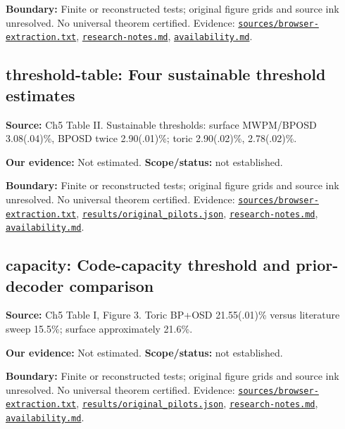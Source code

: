 \documentclass[11pt]{article}
\begin{document}
\textbf{Boundary:} Finite or reconstructed tests; original figure grids and source ink unresolved. No universal theorem certified. Evidence: \href{https://github.com/alectionary/vibe-math/blob/master/formalization/quintavalle-hgp/sources/browser-extraction.txt}{\nolinkurl{sources/browser-extraction.txt}}, \href{https://github.com/alectionary/vibe-math/blob/master/formalization/quintavalle-hgp/research-notes.md}{\nolinkurl{research-notes.md}}, \href{https://github.com/alectionary/vibe-math/blob/master/formalization/quintavalle-hgp/availability.md}{\nolinkurl{availability.md}}.
\subsection{threshold-table: Four sustainable threshold estimates}
\label{claim:threshold-table}
\textbf{Source:} Ch5 Table II. Sustainable thresholds: surface MWPM/BPOSD 3.08(.04)\%, BPOSD twice 2.90(.01)\%; toric 2.90(.02)\%, 2.78(.02)\%.

\textbf{Our evidence:} Not estimated. \textbf{Scope/status:} not established.

\textbf{Boundary:} Finite or reconstructed tests; original figure grids and source ink unresolved. No universal theorem certified. Evidence: \href{https://github.com/alectionary/vibe-math/blob/master/formalization/quintavalle-hgp/sources/browser-extraction.txt}{\nolinkurl{sources/browser-extraction.txt}}, \href{https://github.com/alectionary/vibe-math/blob/master/formalization/quintavalle-hgp/results/original_pilots.json}{\nolinkurl{results/original_pilots.json}}, \href{https://github.com/alectionary/vibe-math/blob/master/formalization/quintavalle-hgp/research-notes.md}{\nolinkurl{research-notes.md}}, \href{https://github.com/alectionary/vibe-math/blob/master/formalization/quintavalle-hgp/availability.md}{\nolinkurl{availability.md}}.
\subsection{capacity: Code-capacity threshold and prior-decoder comparison}
\label{claim:capacity}
\textbf{Source:} Ch5 Table I, Figure 3. Toric BP+OSD 21.55(.01)\% versus literature sweep 15.5\%; surface approximately 21.6\%.

\textbf{Our evidence:} Not estimated. \textbf{Scope/status:} not established.

\textbf{Boundary:} Finite or reconstructed tests; original figure grids and source ink unresolved. No universal theorem certified. Evidence: \href{https://github.com/alectionary/vibe-math/blob/master/formalization/quintavalle-hgp/sources/browser-extraction.txt}{\nolinkurl{sources/browser-extraction.txt}}, \href{https://github.com/alectionary/vibe-math/blob/master/formalization/quintavalle-hgp/results/original_pilots.json}{\nolinkurl{results/original_pilots.json}}, \href{https://github.com/alectionary/vibe-math/blob/master/formalization/quintavalle-hgp/research-notes.md}{\nolinkurl{research-notes.md}}, \href{https://github.com/alectionary/vibe-math/blob/master/formalization/quintavalle-hgp/availability.md}{\nolinkurl{availability.md}}.
\end{document}
